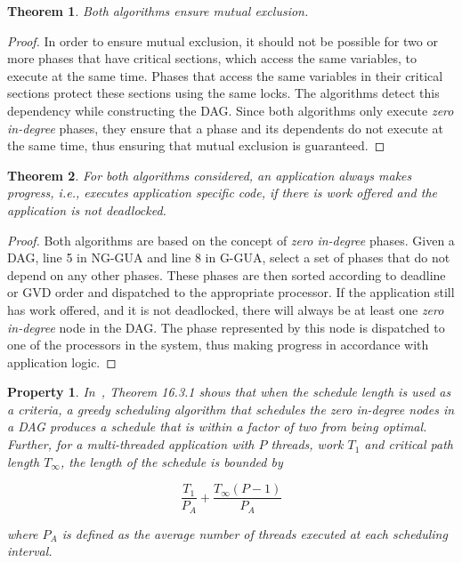 \documentclass[12pt,dvips]{report}
\newtheorem{thm}{Theorem}
\newtheorem{prop}{Property}
\begin{document}
\begin{thm}Both algorithms ensure mutual exclusion.
\end{thm}

\begin{proof}In order to ensure mutual exclusion, it should not be possible for two or more phases that have critical sections, which access the same variables, to execute at the same time. Phases that access the same variables in their critical sections protect these sections using the same locks. The algorithms detect this dependency while constructing the DAG. Since both algorithms only execute \textit{zero in-degree} phases, they ensure that a phase and its dependents do not execute at the same time, thus ensuring that mutual exclusion is guaranteed.
\end{proof}

\begin{thm}For both algorithms considered, an application always makes progress, i.e., executes application specific code, if there is work offered and the application is not deadlocked.
\end{thm}

\begin{proof}Both algorithms are based on the concept of \textit{zero in-degree} phases. Given a DAG, line 5 in NG-GUA and line 8 in G-GUA, select a set of phases that do not depend on any other phases. These phases are then sorted according to deadline or GVD order and dispatched to the appropriate processor. If the application still has work offered, and it is not deadlocked, there will always be at least one \textit{zero in-degree} node in the DAG. The phase represented by this node is dispatched to one of the processors in the system, thus making progress in accordance with application logic.
\end{proof}

\begin{prop}\label{prop:Length}In~\cite{ArtOfMpP}, Theorem 16.3.1 shows that when the schedule length is used as a criteria, a greedy scheduling algorithm that schedules the \textit{zero in-degree} nodes in a DAG produces a schedule that is within a factor of two from being optimal. Further, for a multi-threaded application with $P$ threads, work $T_1$ and critical path length $T_\infty$, the length of the schedule is bounded by

$$\frac{T_1}{P_A}+\frac{T_\infty(P-1)}{P_A}$$

where $P_A$ is defined as the average number of threads executed at each scheduling interval.
\end{prop}
\end{document}
